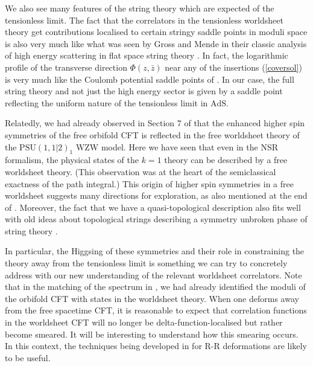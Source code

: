 \documentclass[12pt,a4paper]{article}
\begin{document}
We also see many features of the string theory which are expected of the tensionless limit. The fact that the correlators in the tensionless worldsheet theory get contributions localised to certain stringy saddle points in moduli space is also very much like what was seen by Gross and Mende in their classic analysis of high energy scattering in flat space string theory \cite{Gross:1987ar}. In fact, the logarithmic profile of the transverse direction $\Phi(z,\bar{z})$ near any of the insertions (\ref{coversol}) is very much like the Coulomb potential saddle points of \cite{Gross:1987ar}. In our case, the full string theory and not just the high energy sector is given by a saddle point reflecting the uniform nature of the tensionless limit in $\text{AdS}$.

Relatedly, we had already observed in Section 7 of  \cite{Eberhardt:2018ouy} that the enhanced higher spin symmetries \cite{Gross:1988ue,Gaberdiel:2014cha} of the free orbifold CFT is reflected in the free worldsheet theory of the $\mathrm{PSU}(1,1|2)_1$ WZW model. Here we have seen that even in the NSR formalism, the physical states of the $k=1$ theory can be described by a free worldsheet theory. (This observation was at the heart of the semiclassical exactness of the path integral.) This origin of higher spin symmetries in a free worldsheet suggests many directions for exploration, as also mentioned at the end of \cite{Eberhardt:2018ouy}. Moreover, the fact that we have a quasi-topological description also fits well with old ideas about topological strings describing a symmetry unbroken phase of string theory \cite{Witten:1988xj}. 
 
In particular, the Higgsing of these symmetries and their role in constraining the theory away from the tensionless limit is something we can try to concretely address with our new understanding of the relevant worldsheet correlators. Note that in the matching of the spectrum in \cite{Gaberdiel:2018rqv, Eberhardt:2018ouy}, we had already identified the moduli of the orbifold CFT with states in the worldsheet theory. When one deforms away from the free spacetime CFT, it is reasonable to expect that correlation functions in the worldsheet CFT will no longer be delta-function-localised but rather become smeared. It will be interesting to understand how this smearing occurs. In this context, the techniques being developed in \cite{Eberhardt:2018exh, Cho:2018nfn} for R-R deformations are likely to be useful. 
\end{document}
